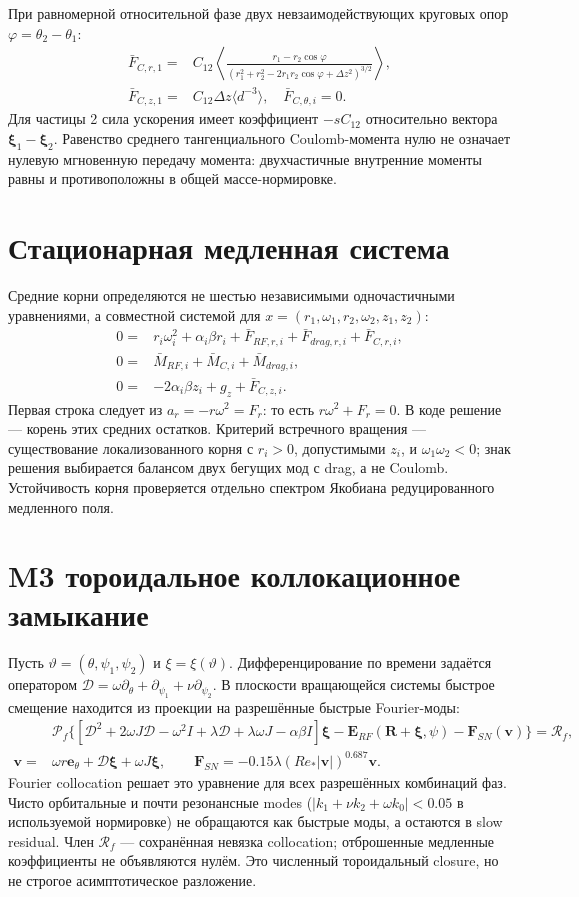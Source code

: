 \documentclass[11pt]{article}
\begin{document}
При равномерной относительной фазе двух невзаимодействующих круговых опор $\varphi=\theta_2-\theta_1$:
\begin{align}
 \bar F_{C,r,1}={}&C_{12}\left\langle
 \frac{r_1-r_2\cos\varphi}
 {(r_1^2+r_2^2-2r_1r_2\cos\varphi+\Delta z^2)^{3/2}}
 \right\rangle,\\
 \bar F_{C,z,1}={}&C_{12}\Delta z\langle d^{-3}\rangle,\quad
 \bar F_{C,\theta,i}=0.
\end{align}
Для частицы 2 сила ускорения имеет коэффициент $-sC_{12}$ относительно вектора $\bm\xi_1-\bm\xi_2$. Равенство среднего тангенциального Coulomb-момента нулю не означает нулевую мгновенную передачу момента: двухчастичные внутренние моменты равны и противоположны в общей массе-нормировке.

\section{Стационарная медленная система}
Средние корни определяются не шестью независимыми одночастичными уравнениями, а совместной системой для $x=(r_1,\omega_1,r_2,\omega_2,z_1,z_2)$:
\begin{align}
 0={}&r_i\omega_i^2+\alpha_i\beta r_i
 +\bar F_{RF,r,i}+\bar F_{drag,r,i}+\bar F_{C,r,i},\\
 0={}&\bar M_{RF,i}+\bar M_{C,i}+\bar M_{drag,i},\\
 0={}&-2\alpha_i\beta z_i+g_z+\bar F_{C,z,i}.
\end{align}
Первая строка следует из $a_r=-r\omega^2=F_r$: то есть $r\omega^2+F_r=0$. В коде решение — корень этих средних остатков. Критерий встречного вращения — существование локализованного корня с $r_i>0$, допустимыми $z_i$, и $\omega_1\omega_2<0$; знак решения выбирается балансом двух бегущих мод с drag, а не Coulomb. Устойчивость корня проверяется отдельно спектром Якобиана редуцированного медленного поля.

\section{M3 тороидальное коллокационное замыкание}
Пусть $\vartheta=(\theta,\psi_1,\psi_2)$ и $\xi=\xi(\vartheta)$. Дифференцирование по времени задаётся оператором $\mathcal D=\omega\partial_\theta+\partial_\psi_1+\nu\partial_\psi_2$. В плоскости вращающейся системы быстрое смещение находится из проекции на разрешённые быстрые Fourier-моды:
\begin{align}
 &\mathcal P_f\{[\mathcal D^2+2\omega J\mathcal D-\omega^2I
 +\lambda\mathcal D+\lambda\omega J-\alpha\beta I]\bm\xi
 -\bm E_{RF}(\bm R+\bm\xi,\psi)-\bm F_{SN}(\bm v)\}
 =\mathcal R_f,\\
 \bm v={}&\omega r\bm e_\theta
 +\mathcal D\bm\xi+\omega J\bm\xi,\qquad
 \bm F_{SN}=-0.15\lambda(Re_*|\bm v|)^{0.687}\bm v.
\end{align}
Fourier collocation решает это уравнение для всех разрешённых комбинаций фаз. Чисто орбитальные и почти резонансные modes ($|k_1+\nu k_2+\omega k_0|<0.05$ в используемой нормировке) не обращаются как быстрые моды, а остаются в slow residual. Член $\mathcal R_f$ — сохранённая невязка collocation; отброшенные медленные коэффициенты не объявляются нулём. Это численный тороидальный closure, но не строгое асимптотическое разложение.
\end{document}
